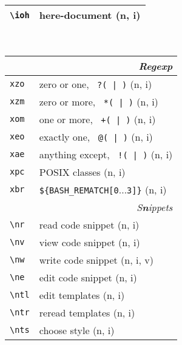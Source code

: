 \documentclass[oneside,11pt,landscape,DIV16]{scrartcl}
\begin{document}
\begin{multicols}{3}
\begin{center}
\begin{tabular}[]{|p{11mm}|p{60mm}|}
\hline \verb'\ioh'   & here-document                    \hfill (n, i)\\
\hline
%
\end{tabular}\\
%
%
\begin{tabular}[]{|p{11mm}|p{62mm}|}
%
\hline
\multicolumn{2}{|r|}{\textsl{Rege\textbf{x}p}}     \\[1.0ex]
\hline     \verb'xzo' & zero or one,      \verb' ?( | )'  \hfill (n, i)\\ 
\hline     \verb'xzm' & zero or more,     \verb' *( | )'  \hfill (n, i)\\ 
\hline     \verb'xom' & one or more,      \verb' +( | )'  \hfill (n, i)\\ 
\hline     \verb'xeo' & exactly one,      \verb' @( | )'  \hfill (n, i)\\ 
\hline     \verb'xae' & anything except,  \verb' !( | )'  \hfill (n, i)\\ 
\hline     \verb'xpc' &  POSIX classes                  \hfill (n, i)\\ 
\hline     \verb'xbr' &  \verb'${BASH_REMATCH[0'$\ldots$\verb'3]}'  \hfill (n, i)\\ 
\hline
%
\hline
\multicolumn{2}{|r|}{\textsl{S\textbf{n}ippets}}               \\[1.0ex]
\hline \verb'\nr'  & read code snippet         \hfill (n, i)\\
\hline \verb'\nv'  & view code snippet         \hfill (n, i)\\
\hline \verb'\nw'  & write code snippet        \hfill (n, i, v)\\
\hline \verb'\ne'  & edit code snippet         \hfill (n, i)\\
\hline \verb'\ntl' & edit templates            \hfill (n, i)\\
\hline \verb'\ntr' & reread templates          \hfill (n, i)\\
\hline \verb'\nts' & choose style              \hfill (n, i)\\

\end{tabular}
\end{center}
\end{multicols}
\end{document}
